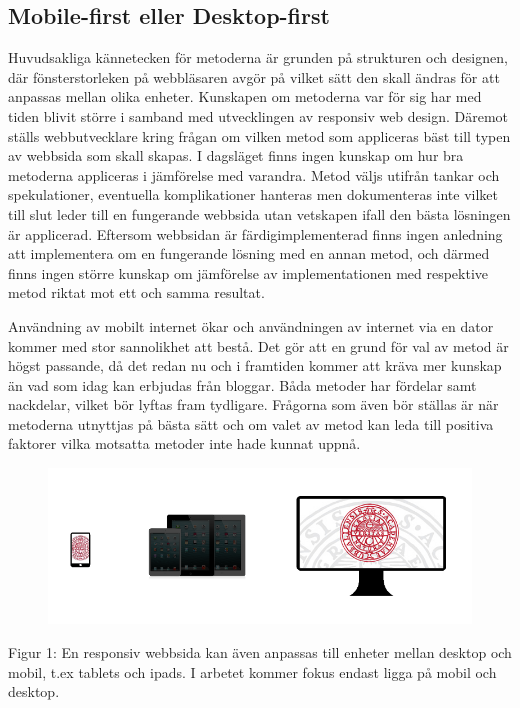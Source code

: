 \documentclass[11pt]{article}
\begin{document}
\subsection{Mobile-first eller Desktop-first}
Huvudsakliga kännetecken för metoderna är grunden på strukturen och designen, där fönsterstorleken på webbläsaren avgör på vilket sätt den skall ändras för att anpassas mellan olika enheter. Kunskapen om metoderna var för sig har med tiden blivit större i samband med utvecklingen av responsiv web design. Däremot ställs webbutvecklare kring frågan om vilken metod som appliceras bäst till typen av webbsida som skall skapas. I dagsläget finns ingen kunskap om hur bra metoderna appliceras i jämförelse med varandra. Metod väljs utifrån tankar och spekulationer, eventuella komplikationer hanteras men dokumenteras inte vilket till slut leder till en fungerande webbsida utan vetskapen ifall den bästa lösningen är applicerad. Eftersom webbsidan är färdigimplementerad finns ingen anledning att implementera om en fungerande lösning med en annan metod, och därmed finns ingen större kunskap om jämförelse av implementationen med respektive metod riktat mot ett och samma resultat.

Användning av mobilt internet ökar och användningen av internet via en dator kommer med stor sannolikhet att bestå. Det gör att en grund för val av metod är högst passande, då det redan nu och i framtiden kommer att kräva mer kunskap än vad som idag kan erbjudas från bloggar. Båda metoder har fördelar samt nackdelar, vilket bör lyftas fram tydligare. Frågorna som även bör ställas är när metoderna utnyttjas på bästa sätt och om valet av metod kan leda till positiva faktorer vilka motsatta metoder inte hade kunnat uppnå.

\begin{figure}[h]
\centerline{%
\includegraphics[scale=0.6]{pics/olikaenheter.png}
}
\end{figure}
\vspace{0,5cm}
Figur 1: En responsiv webbsida kan även anpassas till enheter mellan desktop och mobil, t.ex  tablets och ipads.  I arbetet kommer fokus endast ligga på mobil och desktop.
\end{document}
